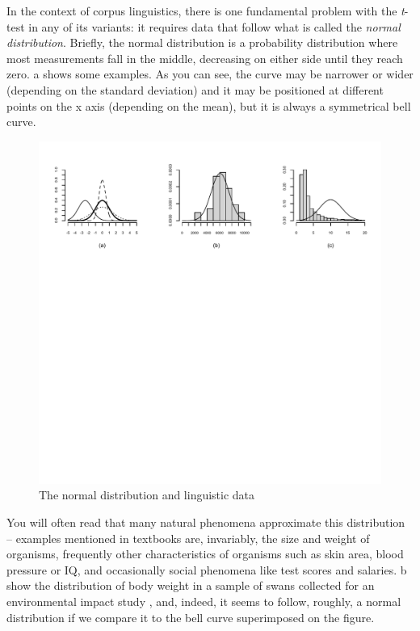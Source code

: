 In the context of corpus linguistics, there is one fundamental problem with the \textit{t}-test  in any of its variants: it requires data that follow what is called the \textit{normal distribution}. Briefly, the normal distribution  is a probability  distribution where most measurements  fall in the middle, decreasing on either side until they reach zero. a shows some examples. As you can see, the curve may be narrower or wider (depending on the standard deviation) and it may be positioned at different points on the x axis (depending on the mean),  but it is always a symmetrical bell curve.

\begin{figure}
\caption{The normal distribution and linguistic data}
\label{fig:normdist}
\includegraphics[width=\textwidth,keepaspectratio]{figures/normdist}
\end{figure}

You will often read that many natural phenomena approximate this distribution -- examples mentioned in textbooks are, invariably, the size and weight of organisms, frequently other characteristics of organisms such as skin area, blood pressure or IQ, and occasionally social phenomena like test scores and salaries. b show the distribution of body weight in a sample of swans collected for an environmental impact study \citep{fite_residues_1979}, and, indeed, it seems to follow, roughly, a normal distribution  if we compare it to the bell curve superimposed on the figure.


